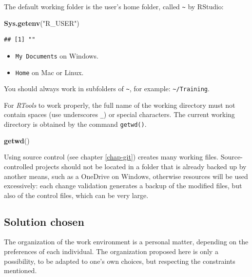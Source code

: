 \documentclass[
  12pt,
  american,
  a4paper,
  extrafontsizes,onecolumn,openright
  ]{memoir}
\newenvironment{Shaded}{\begin{snugshade}}{\end{snugshade}}
\newcommand{\FunctionTok}[1]{\textcolor[rgb]{0.13,0.29,0.53}{\textbf{#1}}}
\newcommand{\NormalTok}[1]{#1}
\newcommand{\StringTok}[1]{\textcolor[rgb]{0.31,0.60,0.02}{#1}}
\providecommand{\tightlist}{%
  \setlength{\itemsep}{0pt}\setlength{\parskip}{0pt}}
\begin{document}
The default working folder is the user's home folder, called \texttt{\textasciitilde{}} by RStudio:

\scriptsize

\begin{Shaded}
\begin{Highlighting}[]
\FunctionTok{Sys.getenv}\NormalTok{(}\StringTok{"R\_USER"}\NormalTok{)}
\end{Highlighting}
\end{Shaded}

\begin{verbatim}
## [1] ""
\end{verbatim}

\normalsize

\begin{itemize}
\tightlist
\item
  \texttt{My\ Documents} on Windows.
\item
  \texttt{Home} on Mac or Linux.
\end{itemize}

You should always work in subfolders of \texttt{\textasciitilde{}}, for example: \texttt{\textasciitilde{}/Training}.

For \emph{RTools} to work properly, the full name of the working directory must not contain spaces (use underscores \texttt{\_}) or special characters.
The current working directory is obtained by the command \texttt{getwd()}.

\scriptsize

\begin{Shaded}
\begin{Highlighting}[]
\FunctionTok{getwd}\NormalTok{()}
\end{Highlighting}
\end{Shaded}

\normalsize

Using source control (see chapter \ref{chap-git}) creates many working files.
Source-controlled projects should not be located in a folder that is already backed up by another means, such as a OneDrive on Windows, otherwise resources will be used excessively: each change validation generates a backup of the modified files, but also of the control files, which can be very large.

\subsection{Solution chosen}\label{sec:solution-dossiers}

The organization of the work environment is a personal matter, depending on the preferences of each individual.
The organization proposed here is only a possibility, to be adapted to one's own choices, but respecting the constraints mentioned.
\end{document}
